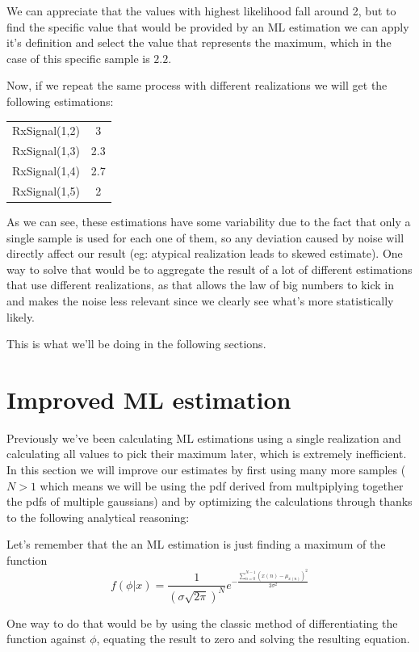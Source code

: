 \documentclass[conference,9pt]{IEEEtran}
\begin{document}
We can appreciate that the values with highest likelihood fall around 2, but to find the specific value that would be provided by an ML estimation we can apply it's definition and select the value that represents the maximum, which in the case of this specific sample is $2.2$.

Now, if we repeat the same process with different realizations we will get the following estimations:

\begin{center}
    \begin{tabular}{ c c }
    RxSignal(1,2) & 3  \\ 
    RxSignal(1,3) & 2.3  \\  
    RxSignal(1,4) & 2.7  \\  
    RxSignal(1,5) & 2   
    \end{tabular}
\end{center}

As we can see, these estimations have some variability due to the fact that only a single sample is used for each one of them, so any deviation caused by noise will directly affect our result (eg: atypical realization leads to skewed estimate). One way to solve that would be to aggregate the result of a lot of different estimations that use different realizations, as that allows the law of big numbers to kick in and makes the noise less relevant since we clearly see what's more statistically likely.

This is what we'll be doing in the following sections.

\section{Improved ML estimation}
Previously we've been calculating ML estimations using a single realization and calculating all values to pick their maximum later, which is extremely inefficient. In this section we will improve our estimates by first using many more samples ($N>1$ which means we will be using the pdf derived from multpiplying together the pdfs of multiple gaussians) and by optimizing the calculations through thanks to the following analytical reasoning:

Let's remember that the an ML estimation is just finding a maximum of the function
$$f(\phi|x)=\frac{1}{(\sigma\sqrt{2\pi})^N}e^{-\frac{\sum_{n=0}^{N-1}(x(n)-\mu_{x(n)})^2}{2\sigma^2}}$$

One way to do that would be by using the classic method of differentiating the function against $\phi$, equating the result to zero and solving the resulting equation.
\end{document}
